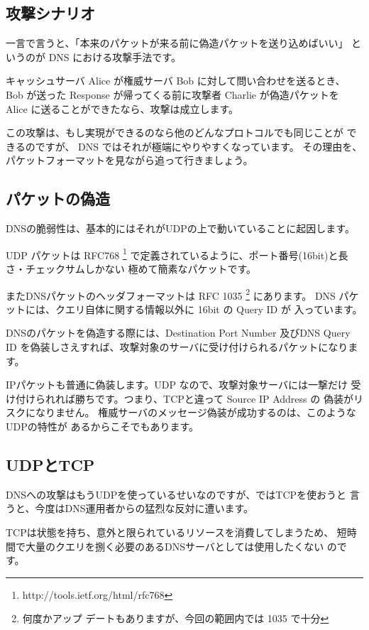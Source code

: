 \subsection{攻撃シナリオ}
一言で言うと、「本来のパケットが来る前に偽造パケットを送り込めばいい」
というのが DNS における攻撃手法です。

キャッシュサーバ Alice が権威サーバ Bob に対して問い合わせを送るとき、
Bob が送った Response が帰ってくる前に攻撃者 Charlie が偽造パケットを
Alice に送ることができたなら、攻撃は成立します。

この攻撃は、もし実現ができるのなら他のどんなプロトコルでも同じことが
できるのですが、 DNS ではそれが極端にやりやすくなっています。
その理由を、パケットフォーマットを見ながら追って行きましょう。

\subsection{パケットの偽造}
DNSの脆弱性は、基本的にはそれがUDPの上で動いていることに起因します。


UDP パケットは RFC768 \footnote{http://tools.ietf.org/html/rfc768}
で定義されているように、ポート番号(16bit)と長さ・チェックサムしかない
極めて簡素なパケットです。


またDNSパケットのヘッダフォーマットは RFC 1035 \footnote{何度かアップ
デートもありますが、今回の範囲内では 1035 で十分} にあります。
DNS パケットには、クエリ自体に関する情報以外に 16bit の Query ID が
入っています。

DNSのパケットを偽造する際には、Destination Port Number 及びDNS Query
ID を偽装しさえすれば、攻撃対象のサーバに受け付けられるパケットになります。

IPパケットも普通に偽装します。UDP なので、攻撃対象サーバには一撃だけ
受け付けられれば勝ちです。つまり、TCPと違って Source IP Address の
偽装がリスクになりません。
権威サーバのメッセージ偽装が成功するのは、このようなUDPの特性が
あるからこそでもあります。

\subsection{UDPとTCP}
DNSへの攻撃はもうUDPを使っているせいなのですが、ではTCPを使おうと
言うと、今度はDNS運用者からの猛烈な反対に遭います。

TCPは状態を持ち、意外と限られているリソースを消費してしまうため、
短時間で大量のクエリを捌く必要のあるDNSサーバとしては使用したくない
のです。

